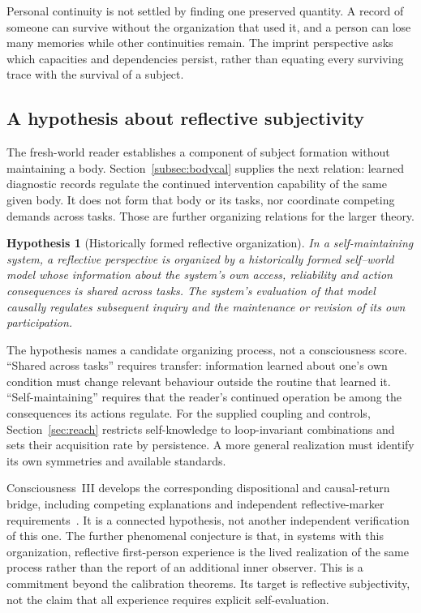 \documentclass[11pt,a4paper]{article}
\newtheorem{hypothesis}[definition]{Hypothesis}
\begin{document}
Personal continuity is not settled by finding one preserved quantity. A record of someone can survive without the organization that used it, and a person can lose many memories while other continuities remain. The imprint perspective asks which capacities and dependencies persist, rather than equating every surviving trace with the survival of a subject.

\subsection{A hypothesis about reflective subjectivity}

The fresh-world reader establishes a component of subject formation without maintaining a body. Section~\ref{subsec:bodycal} supplies the next relation: learned diagnostic records regulate the continued intervention capability of the same given body. It does not form that body or its tasks, nor coordinate competing demands across tasks. Those are further organizing relations for the larger theory.

\begin{hypothesis}[Historically formed reflective organization]\label{hyp:subject}
In a self-maintaining system, a reflective perspective is organized by a historically formed self--world model whose information about the system's own access, reliability and action consequences is shared across tasks. The system's evaluation of that model causally regulates subsequent inquiry and the maintenance or revision of its own participation.
\end{hypothesis}

The hypothesis names a candidate organizing process, not a consciousness score. ``Shared across tasks'' requires transfer: information learned about one's own condition must change relevant behaviour outside the routine that learned it. ``Self-maintaining'' requires that the reader's continued operation be among the consequences its actions regulate. For the supplied coupling and controls, Section~\ref{sec:reach} restricts self-knowledge to loop-invariant combinations and sets their acquisition rate by persistence. A more general realization must identify its own symmetries and available standards.

Consciousness~III develops the corresponding dispositional and causal-return
bridge, including competing explanations and independent reflective-marker
requirements~\cite{CIII}. It is a connected hypothesis, not another independent
verification of this one. The further phenomenal conjecture is that, in systems with this organization, reflective first-person experience is the lived realization of the same process rather than the report of an additional inner observer. This is a commitment beyond the calibration theorems. Its target is reflective subjectivity, not the claim that all experience requires explicit self-evaluation.
\end{document}
